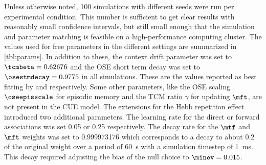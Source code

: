 Unless otherwise noted, \num{100} simulations with different seeds were run per experimental condition.
This number is sufficient to get clear results with reasonably small confidence intervals, but still small enough that the simulation and parameter matching is feasible on a high-performance computing cluster.
The values used for free parameters in the different settings are summarized in \cref{tbl:params}.
In addition to these, the context drift parameter was set to $\tcmbeta = 0.62676$ and the OSE short term decay was set to $\osestmdecay = 0.9775$ in all simulations.
These are the values reported as best fitting by \textcite{Sederberg2008} and \textcite{Choo2010} respectively.
Some other parameters, like the OSE scaling $\oseepisscale$ for episodic memory and the TCM ratio $\gamma$ for updating $\mft$, are not present in the CUE model.
The extensions for the Hebb repetition effect introduced two additional parameters.
The learning rate for the direct or forward associations was set \num{0.05} or \num{0.25} respectively.
The decay rate for the $\mtf$ and $\mft$ weights was set to \num{0.999973176} which corresponds to a decay to about $0.2$ of the original weight over a period of \SI{60}{\second} with a simulation timestep of \SI{1}{\milli\second}.
This decay required adjusting the bias of the null choice to $\minev = 0.015$.
